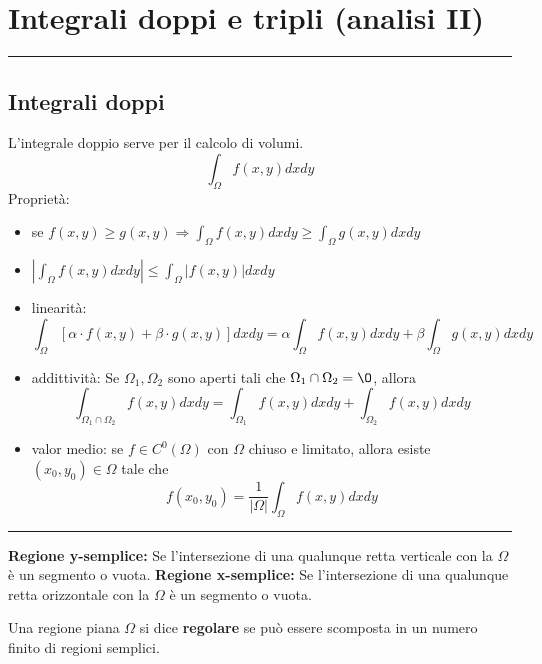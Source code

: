 \section{Integrali doppi e tripli (analisi II)}
\rule{\textwidth}{2pt}
\subsection{Integrali doppi}
L'integrale doppio serve per il calcolo di volumi.\newline
\[
    \int_{\Omega} f(x,y) dxdy
\]
Proprietà:
\begin{itemize}
    \item se $f(x,y)\geq g(x,y) \Rightarrow \int_\Omega f(x,y) dxdy \geq \int_{\Omega} g(x,y)dxdy$
    \item $|\int_{\Omega}f(x,y) dxdy| \leq \int_{\Omega}|f(x,y)|dxdy$
    \item linearità:
    \[
        \int_{\Omega}[\alpha \cdot f(x,y) + \beta \cdot g(x,y)]dxdy = \alpha \int_{\Omega} f(x,y) dxdy + \beta \int_{\Omega} g(x,y) dxdy
    \]
    \item addittività: Se $\Omega_1, \Omega_2$ sono aperti tali che $\Omega_1 \cap \Omega_2 = \O$, allora
    \[
        \int_{\Omega_1 \cap \Omega_2}f(x,y)dxdy = \int_{\Omega_1} f(x,y) dxdy + \int_{\Omega_2} f(x,y) dxdy
    \]
    \item valor medio: se $f \in C^0(\Omega)$ con $\Omega$ chiuso e limitato, allora esiste $(x_0, y_0) \in\Omega$ tale che 
    \[
        f(x_0, y_0) = \frac{1}{|\Omega|}\int_{\Omega}f(x,y)dxdy
    \]
\end{itemize}
\rule{\textwidth}{0,4pt}\newline
\begin{tcolorbox}
\textbf{Regione y-semplice:} Se l'intersezione di una qualunque retta verticale con la $\Omega$ è un segmento o vuota.\newline
\textbf{Regione x-semplice:} Se l'intersezione di una qualunque retta orizzontale con la $\Omega$ è un segmento o vuota.\newline
\end{tcolorbox}
Una regione piana $\Omega$ si dice \textbf{regolare} se può essere scomposta in un numero finito di regioni semplici.
